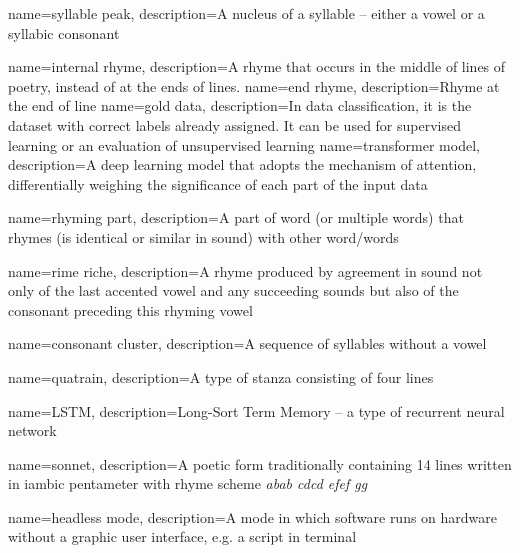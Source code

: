 
{
	name=syllable peak,
	description={A nucleus of a syllable -- either a vowel or a syllabic consonant}
}

{
	name={internal rhyme},
	description={A rhyme that occurs in the middle of lines of poetry, instead of at the ends of lines.}
}
{
	name={end rhyme},
	description={Rhyme at the end of line}
}
{
	name={gold data},
	description={In data classification, it is the dataset with correct labels already assigned. It can be used for supervised learning or an evaluation of unsupervised learning}
}
{
	name=transformer model,
	description={A deep learning model that adopts the mechanism of attention, differentially weighing the significance of each part of the input data}
}

{
	name=rhyming part,
	description={A part of word (or multiple words) that rhymes (is identical or similar in sound) with other word/words}
}


{
	name=rime riche,
	description={A rhyme produced by agreement in sound not only of the last accented vowel and any succeeding sounds but also of the consonant preceding this rhyming vowel}
}


{
	name=consonant cluster,
	description={A sequence of syllables without a vowel}
}

{
	name=quatrain,
	description={A type of stanza consisting of four lines}
}

{
	name=LSTM,
	description={Long-Sort Term Memory -- a type of recurrent neural network}
}

{
	name=sonnet,
	description={A poetic form traditionally containing 14 lines written in iambic pentameter with rhyme scheme \textit{abab cdcd efef gg}}
}

{
	name=headless mode,
	description={A mode in which software runs on hardware without a graphic user interface, e.g. a script in terminal}
}
